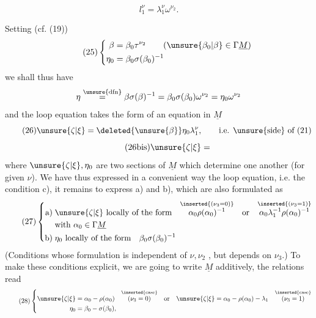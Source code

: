 
\[
\tag{24} l_1^\nu=\lambda_1^\nu\omega^{\nu_2}.
\]

Setting (cf. (19))
\[
\tag{25}
\left\{\begin{aligned}
\beta&=\beta_0\tau^{\nu_2}\qquad(\unsure{\beta_0|\beta}\in\Gamma\underline M)\\
\eta_0&=\beta_0\sigma(\beta_0)^{-1}
\end{aligned}\right.
\]
we shall thus have
\[
\eta\overset{\unsure{\mathrm{dfn}}}{=}
\beta\sigma(\beta)^{-1}
=\beta_0\sigma(\beta_0)\omega^{\nu_2}
=\eta_0\omega^{\nu_2}
\]
and the loop equation takes the form
of an equation in $\underline M$
\[
\tag{26}
\unsure{\zeta|\xi}=\deleted{\unsure{\beta}}\eta_0\lambda_1^\nu,
\qquad\text{i.e. \unsure{side} of (21)}
\]
\[
\tag{26bis}\unsure{\zeta|\xi}=
\]
where $\unsure{\zeta|\xi},\eta_0$ are two sections of $\underline M$ which
determine one another (for given $\nu$).
We have thus expressed in a
convenient way the loop equation, i.e. the
condition c), it remains to express a) and b),
which are also formulated as
\[
\tag{27}
\left\{\begin{aligned}
\text{a)}\;&\unsure{\zeta|\xi}\ \text{locally of the form}\quad
\overset{\inserted{(\nu_3=0)}}{\alpha_0\rho(\alpha_0)^{-1}}
\quad\text{or}\quad
\overset{\inserted{(\nu_3=1)}}{\alpha_0\lambda_1^{-1}\rho(\alpha_0)^{-1}}\\
&\text{with }\alpha_0\in\Gamma\underline M\\
\text{b)}\;&\eta_0\ \text{locally of the form}\quad\beta_0\sigma(\beta_0)^{-1}
\end{aligned}\right.
\]
(Conditions whose formulation is independent
of $\nu,\nu_2$ , but depends  on
$\nu_3$.) To make these conditions explicit, we
are going to write $\underline M$ additively, the relations
read
\[
\tag{28}
\left\{\begin{aligned}
\unsure{\zeta|\xi}&=\alpha_0-\rho(\alpha_0)
\quad\overset{\inserted{\text{case}}}{(\nu_3=0)}
\quad\text{or}\quad
\unsure{\zeta|\xi}=\alpha_0-\rho(\alpha_0)-\lambda_1
\quad\overset{\inserted{\text{case}}}{(\nu_3=1)}\\
\eta_0&=\beta_0-\sigma(\beta_0),
\end{aligned}\right.
\]

